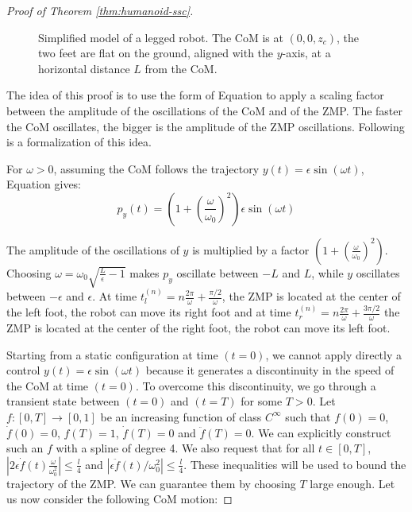 \begin{proof}[Proof of Theorem \ref{thm:humanoid-ssc}]
\begin{figure}
  \centering
  

  \caption{Simplified model of a legged robot. The CoM is at
    $(0,0,z_c)$, the two feet are flat on the ground, aligned with the
    $y$-axis, at a horizontal distance $L$ from the CoM.}
  \label{fig:simple-humanoid}
\end{figure}

The idea of this proof is to use the form of Equation 
to apply a scaling factor between the amplitude of the oscillations of
the CoM and of the ZMP. The faster the CoM oscillates, the bigger is
the amplitude of the ZMP oscillations. Following is a formalization of
this idea.

For $\omega >0$, assuming the CoM follows the trajectory $y(t) =
\epsilon \sin(\omega t)$, Equation  gives:
\begin{equation}
p_y(t) = (1+\left(\frac{\omega}{\omega_0}\right)^2)\epsilon\sin(\omega
t)
\end{equation}

The amplitude of the oscillations of $y$ is multiplied by a factor
$(1+\left(\frac{\omega}{\omega_0}\right)^2)$.  Choosing $\omega =
\omega_0 \sqrt{\frac{L}{\epsilon} -1}$ makes $p_y$ oscillate between
$-L$ and $L$, while $y$ oscillates between $-\epsilon$ and $\epsilon$.
At time $t_l^{(n)} = n\frac{2\pi}{\omega} + \frac{\pi/2}{\omega}$, the
ZMP is located at the center of the left foot, the robot can move its
right foot and at time $t_r^{(n)} = n\frac{2\pi}{\omega} +
\frac{3\pi/2}{\omega}$ the ZMP is located at the center of the right
foot, the robot can move its left foot.

Starting from a static configuration at time $(t=0)$, we cannot apply
directly a control $y(t) = \epsilon \sin(\omega t)$ because it
generates a discontinuity in the speed of the CoM at time $(t=0)$. To
overcome this discontinuity, we go through a transient state between
$(t=0)$ and $(t=T)$ for some $T >0$. Let $f:[0,T] \rightarrow [0,1]$
be an increasing function of class $C^\infty$ such that $f(0) = 0$,
$\dot{f}(0) = 0$, $f(T) = 1$, $\dot{f}(T) = 0$ and $\ddot{f}(T) = 0$.
We can explicitly construct such an $f$ with a spline of degree 4.  We
also request that for all $t \in [0,T]$,
$|2\epsilon\dot{f}(t)\frac{\omega}{\omega_0^2}| \leq \frac{l}{4}$ and
$|\epsilon\ddot{f}(t)/\omega_0^2| \leq \frac{l}{4}$.  These
inequalities will be used to bound the trajectory of the ZMP. We can
guarantee them by choosing $T$ large enough. Let us now consider the
following CoM motion:


\end{proof}
